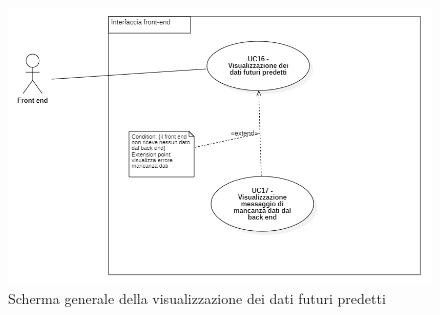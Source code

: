 \begin{center}
	\begin{figure}[H]
		\centering\includegraphics[scale=0.6]{../immagini/attori_casi/UC_16.png}
		\caption{Scherma generale della visualizzazione dei dati futuri predetti}
	\end{figure}
\end{center}


